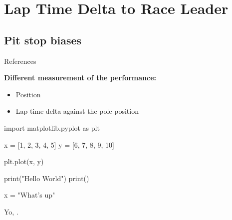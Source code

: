 




\section{Lap Time Delta to Race Leader}
\label{sec:leader-delta}

\blindtext

\subsection{Pit stop biases}

\blindtext

References \citep{asness2018pulling}

\textbf{Different measurement of the performance:}

\begin{itemize}
    \item Position
    \item Lap time delta against the pole position
\end{itemize}

\begin{pyblock}

import matplotlib.pyplot as plt

x = [1, 2, 3, 4, 5]
y = [6, 7, 8, 9, 10]

plt.plot(x, y)

print("Hello World")
print()

\end{pyblock}

\begin{pycode}

x = "What's up"

\end{pycode}

Yo, .



